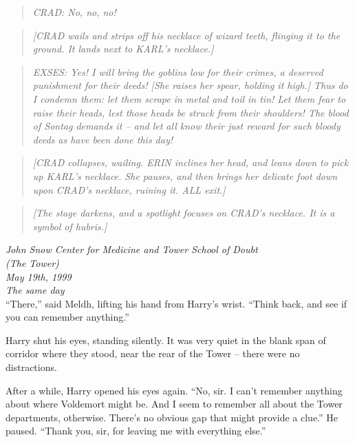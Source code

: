 \begin{quote}
\emph{CRAD: No, no, no!}
\end{quote}

\begin{quote}
\emph{{[}CRAD wails and strips off his necklace of wizard teeth,
flinging it to the ground. It lands next to KARL's necklace.{]}}
\end{quote}

\begin{quote}
\emph{EXSES: Yes! I will bring the goblins low for their crimes, a
deserved punishment for their deeds! {[}She raises her spear, holding it
high.{]} Thus do I condemn them: let them scrape in metal and toil in
tin! Let them fear to raise their heads, lest those heads be struck from
their shoulders! The blood of Sontag demands it -- and let all know
their just reward for such bloody deeds as have been done this day!}
\end{quote}

\begin{quote}
\emph{{[}CRAD collapses, wailing. ERIN inclines her head, and leans down
to pick up KARL's necklace. She pauses, and then brings her delicate
foot down upon CRAD's necklace, ruining it. ALL exit.{]}}
\end{quote}

\begin{quote}
\emph{{[}The stage darkens, and a spotlight focuses on CRAD's necklace.
It is a symbol of hubris.{]}}
\end{quote}


\mybreak

\emph{John Snow Center for Medicine and Tower School of Doubt\\
(The Tower)}\\
\emph{May 19th, 1999}\\
\emph{The same day}\\

``There,'' said Meldh, lifting his hand from Harry's wrist. ``Think
back, and see if you can remember anything.''

Harry shut his eyes, standing silently. It was very quiet in the blank
span of corridor where they stood, near the rear of the Tower -- there
were no distractions.

After a while, Harry opened his eyes again. ``No, sir. I can't remember
anything about where Voldemort might be. And I seem to remember all
about the Tower departments, otherwise. There's no obvious gap that
might provide a clue.'' He paused. ``Thank you, sir, for leaving me with
everything else.''

